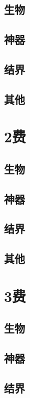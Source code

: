 \documentclass[lang = cn, color = black, 10pt]{AllThatStax}
\begin{document}
\section{生物}

\section{神器}

\section{结界}

\section{其他}

\chapter{2费}

\section{生物}

\section{神器}

\section{结界}

\section{其他}

\chapter{3费}

\section{生物}

\section{神器}

\section{结界}
\end{document}
